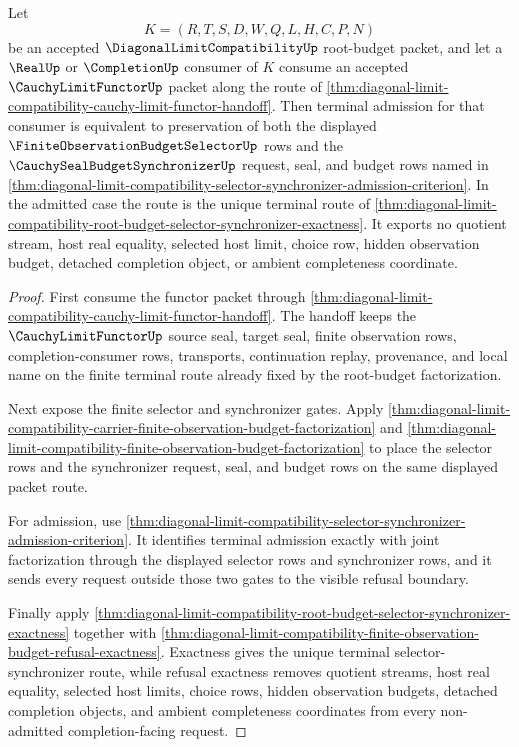 \begin{theorem}
\label{thm:diagonal-limit-compatibility-cauchy-functor-selector-admission-lock}
Let
$$
K=(R,T,S,D,W,Q,L,H,C,P,N)
$$
be an accepted $\DiagonalLimitCompatibilityUp$ root-budget packet, and let a $\RealUp$ or $\CompletionUp$ consumer of $K$ consume an accepted $\CauchyLimitFunctorUp$ packet along the route of \autoref{thm:diagonal-limit-compatibility-cauchy-limit-functor-handoff}. Then terminal admission for that consumer is equivalent to preservation of both the displayed $\FiniteObservationBudgetSelectorUp$ rows and the $\CauchySealBudgetSynchronizerUp$ request, seal, and budget rows named in \autoref{thm:diagonal-limit-compatibility-selector-synchronizer-admission-criterion}. In the admitted case the route is the unique terminal route of \autoref{thm:diagonal-limit-compatibility-root-budget-selector-synchronizer-exactness}. It exports no quotient stream, host real equality, selected host limit, choice row, hidden observation budget, detached completion object, or ambient completeness coordinate.
\end{theorem}
\begin{proof}
First consume the functor packet through \autoref{thm:diagonal-limit-compatibility-cauchy-limit-functor-handoff}. The handoff keeps the $\CauchyLimitFunctorUp$ source seal, target seal, finite observation rows, completion-consumer rows, transports, continuation replay, provenance, and local name on the finite terminal route already fixed by the root-budget factorization.

Next expose the finite selector and synchronizer gates. Apply \autoref{thm:diagonal-limit-compatibility-carrier-finite-observation-budget-factorization} and \autoref{thm:diagonal-limit-compatibility-finite-observation-budget-factorization} to place the selector rows and the synchronizer request, seal, and budget rows on the same displayed packet route.

For admission, use \autoref{thm:diagonal-limit-compatibility-selector-synchronizer-admission-criterion}. It identifies terminal admission exactly with joint factorization through the displayed selector rows and synchronizer rows, and it sends every request outside those two gates to the visible refusal boundary.

Finally apply \autoref{thm:diagonal-limit-compatibility-root-budget-selector-synchronizer-exactness} together with \autoref{thm:diagonal-limit-compatibility-finite-observation-budget-refusal-exactness}. Exactness gives the unique terminal selector-synchronizer route, while refusal exactness removes quotient streams, host real equality, selected host limits, choice rows, hidden observation budgets, detached completion objects, and ambient completeness coordinates from every non-admitted completion-facing request.
\end{proof}

